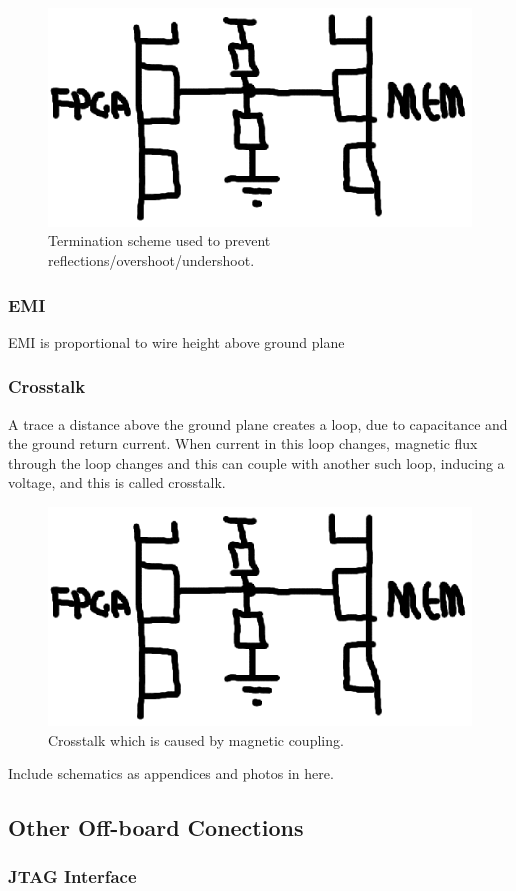 \begin{figure}
\begin{center}
\includegraphics[width=\linewidth]{images/async_fifo.eps}
\caption[DDR Termination]{Termination scheme used to prevent
reflections/overshoot/undershoot.}
\end{center}
\end{figure}

\subsubsection{EMI}
EMI is proportional to wire height above ground
plane\cite{HighSpeedDigitalDesign}

\subsubsection{Crosstalk}
A trace a distance above the ground plane creates a loop, due to capacitance
and the ground return current. When current in this loop changes, magnetic flux
through the loop changes and this can couple with another such loop, inducing
a voltage, and this is called crosstalk.

\begin{figure}
\begin{center}
\includegraphics[width=\linewidth]{images/async_fifo.eps}
\caption{Crosstalk which is caused by magnetic coupling.}
\end{center}
\end{figure}


Include schematics as appendices and photos in here.


\subsection{Other Off-board Conections}

\subsubsection{JTAG Interface}


